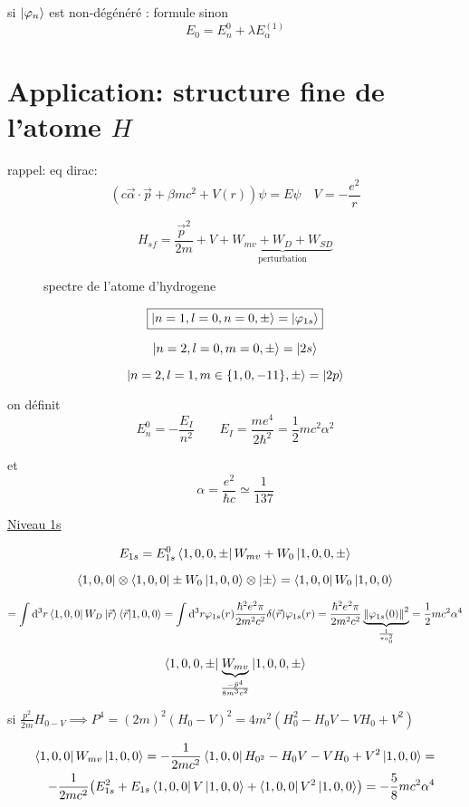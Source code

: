 si $\ket{\varphi_{n}}$ est non-dégénéré : formule
sinon $$E_{0}= E_{n}^0 + \lambda E_\alpha^{(1)}$$ 

\section*{Application: structure fine de l'atome $H$}

rappel: eq dirac: $$(c\vec\alpha\cdot\vec p +\beta mc^2 + V(r))\psi = E\psi\quad V = - \frac{e^2}{r} $$ 

$$H_{sf}= \frac{\vec{p}^2}{2m} + V +\underbrace{W_{mv}+W_{D}+ W_{SD}}_{\text{perturbation}}$$ 

\begin{figure}[h!]
    \centering
    \caption{spectre de l'atome d'hydrogene}
    \label{fig:spectre-de-l'atome-d'hydrogene}
\end{figure}

$$\boxed{\ket{n=1, l=0, n=0, \pm}=\ket{\varphi_{1s}}}$$ 

$$\ket{n=2, l=0, m=0, \pm} = \ket{2s}$$ 

$$\ket{n=2, l=1, m\in \{1,0,-11\}, \pm} = \ket{2p}$$ 


on définit $$E_{n}^{0}=-\frac{E_{I}}{n^{2}}\qquad E_{I}=\frac{m e^{4}}{2 \hbar^{2}}=\frac{1}{2} m c^{2} \alpha^{2}$$ 

et $$\alpha=\frac{e^{2}}{\hbar c} \simeq \frac{1}{137}$$ 

\underline{Niveau 1s} 

$$E_{1s}= E_{1s}^0\bra{1,0,0,\pm} W_{mv}+W_{0}\ket{1,0,0,\pm}$$ 


$$\bra{1,0,0}\otimes\bra{1,0,0}{\pm}W_0\ket{1,0,0}\otimes\ket{\pm} = \bra{1,0,0}W_0\ket{1,0,0}$$ 

$$=\int \dd^3 r \bra{1,0,0} W_D\ket{\vec r}\bra{\vec r}\ket{1,0,0} = \int \dd^3 r \varphi_{1s}(r) \frac{\hbar^2e^2\pi}{2m^2c^2} \delta(\vec r) \varphi_{1s}(r) = \frac{\hbar^2e^2\pi}{2m^2c^2}\underbrace{\norm{\varphi_{1s}(0)}^2}_{\frac{1}{\pi a^2_0} } = \frac{ 1}{2} mc^2 \alpha^4$$ 

$$\bra{1,0,0,\pm}\underbrace{W_{mv}}_{\frac{-\bar p^4}{8m^3c^2} }\ket{1,0,0,\pm}$$ 

si $\frac{p^2}{2m} H_{0-V}\implies P^4 = (2m)^2(H_{0}-V)^2= 4m^2(H_{0}^2-H_{0}V- VH_{0}+V^2)$ 

\begin{align*}\bra{1,0,0}W_{mv}\ket{1,0,0} = - \frac{1}{2mc^2} \bra{1,0,0}H_{0^2}- H_{0} V - VH_{0}+ V^2\ket{1,0,0}=\\ -\frac{1}{2mc^2} \qty(E_{1s}^2+ E_{1s}\bra{1,0,0}V\ket{1,0,0} + \bra{1,0,0}V^2\ket{1,0,0}) = -\frac{5}{8} mc^2 \alpha^4\end{align*}

